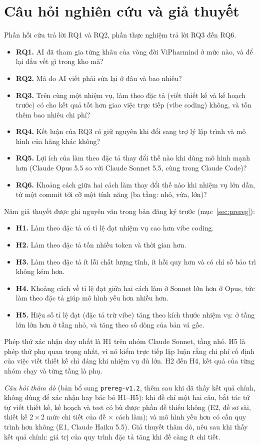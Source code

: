 \section{Câu hỏi nghiên cứu và giả thuyết}\label{sec:questions}

Phần hồi cứu trả lời RQ1 và RQ2, phần thực nghiệm trả lời RQ3 đến RQ6.
\begin{itemize}
\item \textbf{RQ1.} AI đã tham gia từng khâu của vòng đời ViPharmind ở mức nào, và để lại dấu vết gì
trong kho mã?
\item \textbf{RQ2.} Mã do AI viết phải sửa lại ở đâu và bao nhiêu?
\item \textbf{RQ3.} Trên cùng một nhiệm vụ, làm theo đặc tả (viết thiết kế và kế hoạch trước) có cho kết
quả tốt hơn giao việc trực tiếp (vibe coding) không, và tốn thêm bao nhiêu chi phí?
\item \textbf{RQ4.} Kết luận của RQ3 có giữ nguyên khi đổi sang trợ lý lập trình và mô hình của hãng
khác không?
\item \textbf{RQ5.} Lợi ích của làm theo đặc tả thay đổi thế nào khi dùng mô hình mạnh hơn (Claude Opus
5.5 so với Claude Sonnet 5.5, cùng trong Claude Code)?
\item \textbf{RQ6.} Khoảng cách giữa hai cách làm thay đổi thế nào khi nhiệm vụ lớn dần, từ một commit tới
cỡ một tính năng (ba tầng: nhỏ, vừa, lớn)?
\end{itemize}

Năm giả thuyết được ghi nguyên văn trong bản đăng ký trước (mục~\ref{sec:prereg}):
\begin{itemize}
\item \textbf{H1.} Làm theo đặc tả có tỉ lệ đạt nhiệm vụ cao hơn vibe coding.
\item \textbf{H2.} Làm theo đặc tả tốn nhiều token và thời gian hơn.
\item \textbf{H3.} Làm theo đặc tả ít lỗi chất lượng tĩnh, ít hồi quy hơn và có chỉ số bảo trì không kém
hơn.
\item \textbf{H4.} Khoảng cách về tỉ lệ đạt giữa hai cách làm ở Sonnet lớn hơn ở Opus, tức làm theo đặc
tả giúp mô hình yếu hơn nhiều hơn.
\item \textbf{H5.} Hiệu số tỉ lệ đạt (đặc tả trừ vibe) tăng theo kích thước nhiệm vụ: ở tầng lớn lớn hơn ở
tầng nhỏ, và tăng theo số dòng của bản vá gốc.
\end{itemize}

Phép thử xác nhận duy nhất là H1 trên nhóm Claude Sonnet, tầng nhỏ. H5 là phép thử phụ quan trọng nhất,
vì nó kiểm trực tiếp lập luận rằng chi phí cố định của việc viết thiết kế chỉ đáng khi nhiệm vụ đủ lớn.
H2 đến H4, kết quả của từng nhóm chạy và từng tầng là phụ.

\textit{Câu hỏi thăm dò} (bản bổ sung \texttt{prereg-v1.2}, thêm sau khi đã thấy kết quả chính, không
dùng để xác nhận hay bác bỏ H1--H5): khi đề chỉ một hai câu, bắt tác tử tự viết thiết kế, kế hoạch và test
có bù được phần đề thiếu không (E2, đề sơ sài, thiết kế $2\times 2$ mức chi tiết của đề $\times$ cách làm);
và mô hình yếu hơn có cần quy trình hơn không (E1, Claude Haiku 5.5). Giả thuyết thăm dò, nêu sau
khi thấy kết quả chính: giá trị của quy trình đặc tả tăng khi đề càng ít chi tiết.
